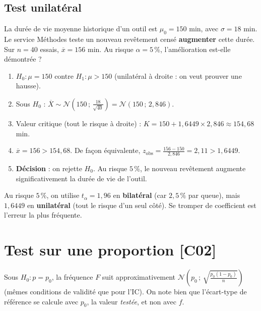 \documentclass[a4paper,11pt]{article}
\begin{document}
\subsection{Test unilatéral}

\begin{exemple}
La durée de vie moyenne historique d'un outil est $\mu_0 = 150$ min, avec $\sigma = 18$ min. Le service Méthodes teste un nouveau revêtement censé \textbf{augmenter} cette durée. Sur $n = 40$ essais, $\overline{x} = 156$ min. Au risque $\alpha = 5\,\%$, l'amélioration est-elle démontrée ?
\begin{enumerate}
  \item $H_0 : \mu = 150$ \quad contre \quad $H_1 : \mu > 150$ (unilatéral à droite : on veut prouver une hausse).
  \item Sous $H_0$ : $\overline{X} \sim \mathcal{N}\!\left(150\,;\,\frac{18}{\sqrt{40}}\right) = \mathcal{N}(150\,;\,2{,}846)$.
  \item Valeur critique (tout le risque à droite) : $K = 150 + 1{,}6449 \times 2{,}846 \approx 154{,}68$ min.
  \item $\overline{x} = 156 > 154{,}68$. De façon équivalente, $z_{\text{obs}} = \frac{156 - 150}{2{,}846} = 2{,}11 > 1{,}6449$.
  \item \textbf{Décision} : on rejette $H_0$. Au risque $5\,\%$, le nouveau revêtement augmente significativement la durée de vie de l'outil.
\end{enumerate}
\end{exemple}

\begin{attention}
Au risque $5\,\%$, on utilise $t_\alpha = 1{,}96$ en \textbf{bilatéral} (car $2{,}5\,\%$ par queue), mais $1{,}6449$ en \textbf{unilatéral} (tout le risque d'un seul côté). Se tromper de coefficient est l'erreur la plus fréquente.
\end{attention}

\newpage
\section{Test sur une proportion \hfill {\normalsize\color{uimmred}[C02]}}

Sous $H_0 : p = p_0$, la fréquence $F$ suit approximativement $\mathcal{N}\!\left(p_0\,;\,\sqrt{\frac{p_0(1-p_0)}{n}}\right)$ (mêmes conditions de validité que pour l'IC). On note bien que l'écart-type de référence se calcule avec $p_0$, la valeur \emph{testée}, et non avec $f$.
\end{document}
